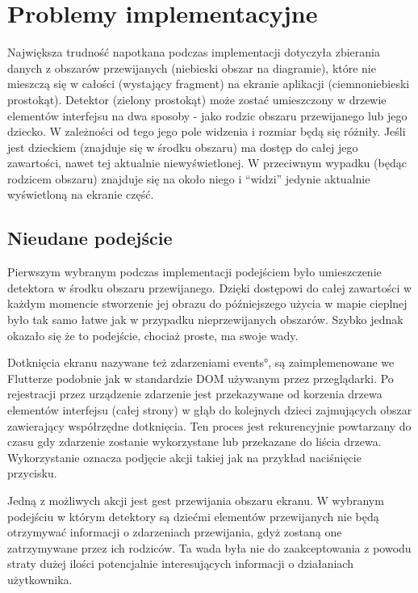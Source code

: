 \section{Problemy implementacyjne}
Największa trudność napotkana podczas implementacji dotyczyła zbierania danych z obszarów przewijanych (niebieski obszar na diagramie), które nie mieszczą się w całości (wystający fragment) na ekranie aplikacji (ciemnoniebieski prostokąt). Detektor (zielony prostokąt) może zostać umieszczony w drzewie elementów interfejsu na dwa sposoby - jako rodzic obszaru przewijanego lub jego dziecko. W zależności od tego jego pole widzenia i rozmiar będą się różniły. Jeśli jest dzieckiem (znajduje się w środku obszaru) ma dostęp do całej jego zawartości, nawet tej aktualnie niewyświetlonej. W przeciwnym wypadku (będąc rodzicem obszaru) znajduje się na około niego i ``widzi'' jedynie aktualnie wyświetloną na ekranie część.


\subsection{Nieudane podejście}
Pierwszym wybranym podczas implementacji podejściem było umieszczenie detektora w środku obszaru przewijanego. Dzięki dostępowi do całej zawartości w każdym momencie stworzenie jej obrazu do późniejszego użycia w mapie cieplnej było tak samo łatwe jak w przypadku nieprzewijanych obszarów. Szybko jednak okazało się że to podejście, chociaż proste, ma swoje wady.

Dotknięcia ekranu nazywane też zdarzeniami \ang{events}, są zaimplemenowane we Flutterze podobnie jak w standardzie DOM używanym przez przeglądarki. Po rejestracji przez urządzenie zdarzenie jest przekazywane od korzenia drzewa elementów interfejsu (całej strony) w głąb do kolejnych dzieci zajmujących obszar zawierający współrzędne dotknięcia. Ten proces jest rekurencyjnie powtarzany do czasu gdy zdarzenie zostanie wykorzystane lub przekazane do liścia drzewa. Wykorzystanie oznacza podjęcie akcji takiej jak na przykład naciśnięcie przycisku.

Jedną z możliwych akcji jest gest przewijania obszaru ekranu. W wybranym podejściu w którym detektory są dziećmi elementów przewijanych nie będą otrzymywać informacji o zdarzeniach przewijania, gdyż zostaną one zatrzymywane przez ich rodziców. Ta wada była nie do zaakceptowania z powodu straty dużej ilości potencjalnie interesujących informacji o działaniach użytkownika.

